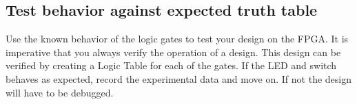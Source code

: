 \documentclass[12pt,journal]{IEEEtran}
\begin{document}
      \subsection{Test behavior against expected truth table} 
      Use the known behavior of the logic gates to test your design on the FPGA. It is imperative that you always verify the operation of a design. This design can be verified by creating a Logic Table for each of the gates. If the LED and switch behaves as expected, record the experimental data and move on. If not the design will have to be debugged.

\end{document}
